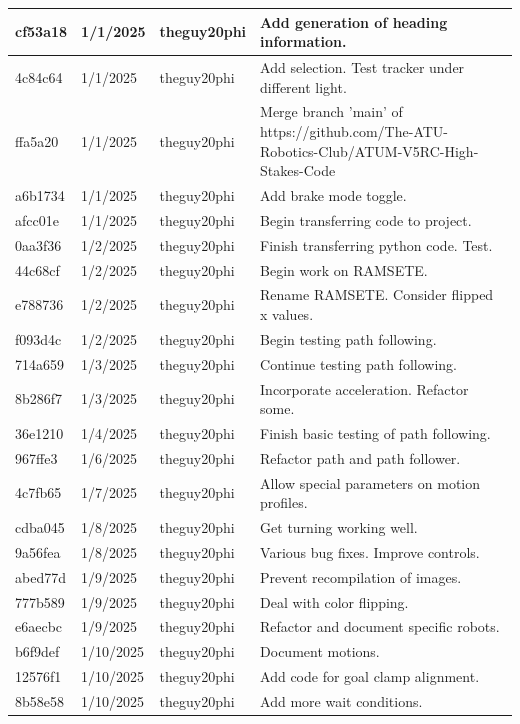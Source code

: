 \begin{center}
\begin{longtable}{|p{28pt}|p{33pt}|p{40pt}|p{300pt}|}
\hline
cf53a18 & 1/1/2025 & theguy20phi & Add generation of heading information. \\
\hline
4c84c64 & 1/1/2025 & theguy20phi & Add selection. Test tracker under different light. \\
\hline
ffa5a20 & 1/1/2025 & theguy20phi & Merge branch 'main' of https://github.com/The-ATU-Robotics-Club/ATUM-V5RC-High-Stakes-Code \\
\hline
a6b1734 & 1/1/2025 & theguy20phi & Add brake mode toggle. \\
\hline
afcc01e & 1/1/2025 & theguy20phi & Begin transferring code to project. \\
\hline
0aa3f36 & 1/2/2025 & theguy20phi & Finish transferring python code. Test. \\
\hline
44c68cf & 1/2/2025 & theguy20phi & Begin work on RAMSETE. \\
\hline
e788736 & 1/2/2025 & theguy20phi & Rename RAMSETE. Consider flipped x values. \\
\hline
f093d4c & 1/2/2025 & theguy20phi & Begin testing path following. \\
\hline
714a659 & 1/3/2025 & theguy20phi & Continue testing path following. \\
\hline
8b286f7 & 1/3/2025 & theguy20phi & Incorporate acceleration. Refactor some. \\
\hline
36e1210 & 1/4/2025 & theguy20phi & Finish basic testing of path following. \\
\hline
967ffe3 & 1/6/2025 & theguy20phi & Refactor path and path follower. \\
\hline
4c7fb65 & 1/7/2025 & theguy20phi & Allow special parameters on motion profiles. \\
\hline
cdba045 & 1/8/2025 & theguy20phi & Get turning working well. \\
\hline
9a56fea & 1/8/2025 & theguy20phi & Various bug fixes. Improve controls. \\
\hline
abed77d & 1/9/2025 & theguy20phi & Prevent recompilation of images. \\
\hline
777b589 & 1/9/2025 & theguy20phi & Deal with color flipping. \\
\hline
e6aecbc & 1/9/2025 & theguy20phi & Refactor and document specific robots. \\
\hline
b6f9def & 1/10/2025 & theguy20phi & Document motions. \\
\hline
12576f1 & 1/10/2025 & theguy20phi & Add code for goal clamp alignment. \\
\hline
8b58e58 & 1/10/2025 & theguy20phi & Add more wait conditions. \\

\end{longtable}
\end{center}
